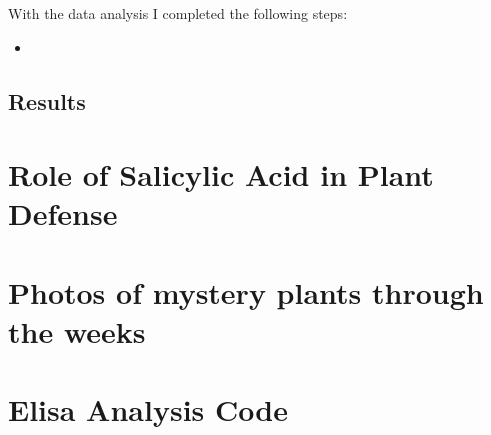 \documentclass[a4]{article}
\begin{document}
	With the data analysis I completed the following steps:

	\begin{itemize}
		\item
	\end{itemize}

	\subsection{Results}


	\section{Role of Salicylic Acid in Plant Defense}
	
	\appendix
	
	\section{Photos of mystery plants through the weeks}
	
	\section{Elisa Analysis Code}
	
  
\end{document}
